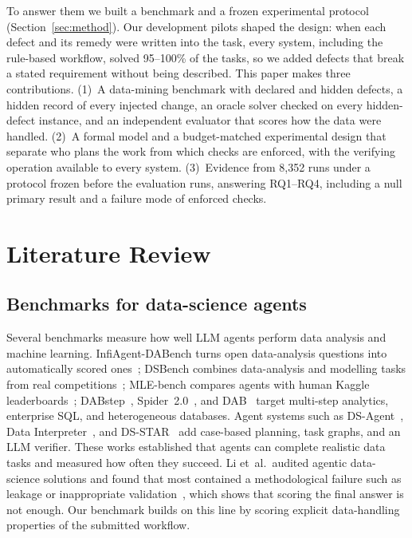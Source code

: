 \documentclass[conference]{IEEEtran}
\begin{document}
To answer them we built a benchmark and a frozen experimental protocol (Section~\ref{sec:method}). Our development
pilots shaped the design: when each defect and its remedy were written into the task, every system, including the
rule-based workflow, solved 95--100\% of the tasks, so we added defects that break a stated requirement without being
described. This paper makes three contributions.
(1)~A data-mining benchmark with declared and hidden defects, a hidden record of every injected change, an oracle
solver checked on every hidden-defect instance, and an independent evaluator that scores how the data were handled.
(2)~A formal model and a budget-matched experimental design that separate who plans the work from which checks are
enforced, with the verifying operation available to every system.
(3)~Evidence from 8,352 runs under a protocol frozen before the evaluation runs, answering RQ1--RQ4, including a
null primary result and a failure mode of enforced checks.

\section{Literature Review}
\label{sec:related}
\subsection{Benchmarks for data-science agents}
Several benchmarks measure how well LLM agents perform data analysis and machine learning. InfiAgent-DABench turns
open data-analysis questions into automatically scored ones~\cite{hu2024infiagent}; DSBench combines data-analysis and
modelling tasks from real competitions~\cite{jing2025dsbench}; MLE-bench compares agents with human Kaggle
leaderboards~\cite{chan2025mlebench}; DABstep~\cite{egg2025dabstep}, Spider~2.0~\cite{lei2025spider2}, and
DAB~\cite{ma2026dab} target multi-step analytics, enterprise SQL, and heterogeneous databases. Agent systems such as
DS-Agent~\cite{guo2024dsagent}, Data Interpreter~\cite{hong2024datainterpreter}, and DS-STAR~\cite{nam2025dsstar}
add case-based planning, task graphs, and an LLM verifier. These works established that agents can complete realistic
data tasks and measured how often they succeed. Li et~al.\ audited agentic data-science solutions and found that
most contained a methodological failure such as leakage or inappropriate validation~\cite{li2026silent}, which shows
that scoring the final answer is not enough. Our benchmark builds on this line by scoring explicit data-handling
properties of the submitted workflow.
\end{document}
